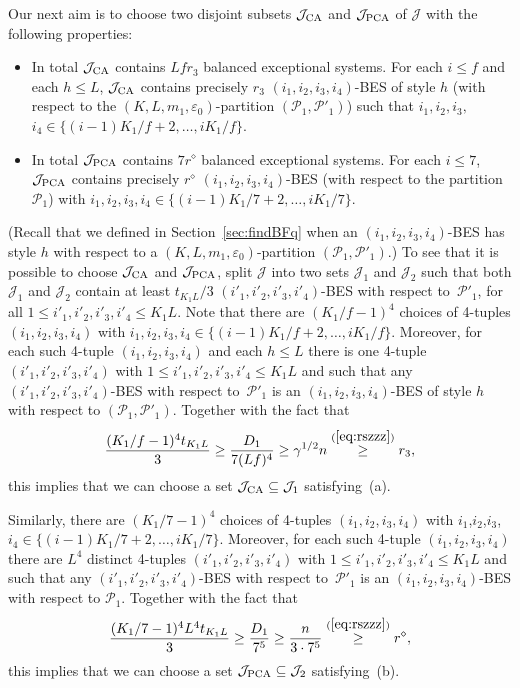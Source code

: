 \documentclass{memo-l}
\def\cP{\mathcal{P}}
\def\eps{\varepsilon}
\def\cJ{\mathcal{J}}
\numberwithin{section}{chapter}
\numberwithin{equation}{section}
\numberwithin{firstthm}{section}
\numberwithin{figure}{section}
\begin{document}
{Our next aim is to choose two disjoint subsets $\mathcal{J}_{\rm CA}$ and $\mathcal{J}_{\rm PCA}$ of $\cJ$ with the
following properties:
\begin{itemize}	
\item[(a)] In total $\mathcal{J}_{\rm CA}$ contains $L f r_3$ balanced exceptional systems. For each $i\le f$ and each $h \le L$,
$\mathcal{J}_{\rm CA}$ contains precisely $r_3$ $(i_1,i_2,i_3,i_4)$-BES of style $h$ (with respect to the
$(K,L,m_1,\eps_0)$-partition $(\cP_1,\cP'_1)$) such that $i_1,i_2,i_3,$ $i_4\in \{(i-1)K_1/f+2,\dots,iK_1/f\}$.
\item[(b)] In total $\mathcal{J}_{\rm PCA}$ contains $7r^\diamond$ balanced exceptional systems. For each $i\le 7$,
$\mathcal{J}_{\rm PCA}$ contains precisely $r^\diamond$ $(i_1,i_2,i_3,i_4)$-BES (with respect to
the partition $\cP_1$) with
$i_1,i_2,i_3,i_4\in \{(i-1)K_1/7+2,\dots,iK_1/7\}$.
\end{itemize}
(Recall that we defined in Section~\ref{sec:findBFq} when an $(i_1,i_2,i_3,i_4)$-BES has style $h$ with respect to a
$(K,L,m_1,\eps_0)$-partition $(\cP_1,\cP'_1)$.)
To see that it is possible to choose $\mathcal{J}_{\rm CA}$ and $\mathcal{J}_{\rm PCA}$, split $\cJ$ into two sets $\cJ_1$ and $\cJ_2$ such that both $\cJ_1$ and $\cJ_2$
contain at least $t_{K_1L}/3$ $(i'_1,i'_2,i'_3,i'_4)$-BES with respect to~$\cP'_1$, for all $1 \le i'_1,i'_2,i'_3,i'_4  \le K_1L$.
Note that there are $(K_1/f-1)^4$ choices of 4-tuples $(i_1,i_2,i_3,i_4)$
with $i_1,i_2,i_3,i_4\in \{(i-1)K_1/f+2,\dots,iK_1/f\}$. Moreover, for each such 4-tuple $(i_1,i_2,i_3,i_4)$
and each $h\le L$ there is one 4-tuple $(i'_1,i'_2,i'_3,i'_4)$ with $1 \le i'_1,i'_2,i'_3,i'_4  \le K_1L$
and such that any $(i'_1,i'_2,i'_3,i'_4)$-BES with respect to~$\cP'_1$ is an $(i_1,i_2,i_3,i_4)$-BES of style $h$ with respect to
$(\cP_1,\cP'_1)$. Together with the fact that
$$ 
\frac{(K_1/f-1)^4t_{K_1L}}{3}\ge \frac{D_1}{7(Lf)^4}\ge \gamma^{1/2}n\stackrel{(\ref{eq:rszzz})}{\ge} r_3,
$$
this implies that we can choose a set $\mathcal{J}_{\rm CA}\subseteq \cJ_1$ satisfying~(a).

Similarly, there are $(K_1/7-1)^4$ choices of 4-tuples $(i_1,i_2,i_3,i_4)$
with $i_1$,$i_2$,$i_3$,$i_4\in \{(i-1)K_1/7+2,\dots,iK_1/7\}$. Moreover, for each such 4-tuple $(i_1,i_2,i_3,i_4)$
there are $L^4$ distinct 4-tuples $(i'_1,i'_2,i'_3,i'_4)$ with $1 \le i'_1,i'_2,i'_3,i'_4  \le K_1L$
and such that any $(i'_1,i'_2,i'_3,i'_4)$-BES with respect to~$\cP'_1$ is an $(i_1,i_2,i_3,i_4)$-BES with respect to
$\cP_1$. Together with the fact that
$$ \frac{(K_1/7-1)^4L^4t_{K_1L}}{3}\ge \frac{D_1}{7^5}\ge \frac{n}{3\cdot 7^5}\stackrel{(\ref{eq:rszzz})}{\ge} r^\diamond,$$
this implies that we can choose a set $\mathcal{J}_{\rm PCA}\subseteq \cJ_2$ satisfying~(b).


}
\end{document}
